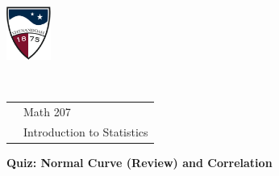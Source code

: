 \documentclass[10pt]{article}
\begin{document}
\pagestyle{empty}
\lstset{language=R, showspaces=false, showstringspaces=false}

\href{http://www.su.edu}{\includegraphics[height=1.75cm]{sulogo.eps}}
\vspace{-1.69cm}

{{\ }\hfill\small
\begin{tabular}{cl}
& Math 207\\
& Introduction to Statistics\\
\end{tabular}
}
\setlength{\baselineskip}{1.05\baselineskip}
\bigskip

\begin{center}
\textbf{\large  Quiz:  Normal Curve (Review) and Correlation}
\end{center}\vspace{-18pt}
\end{document}
